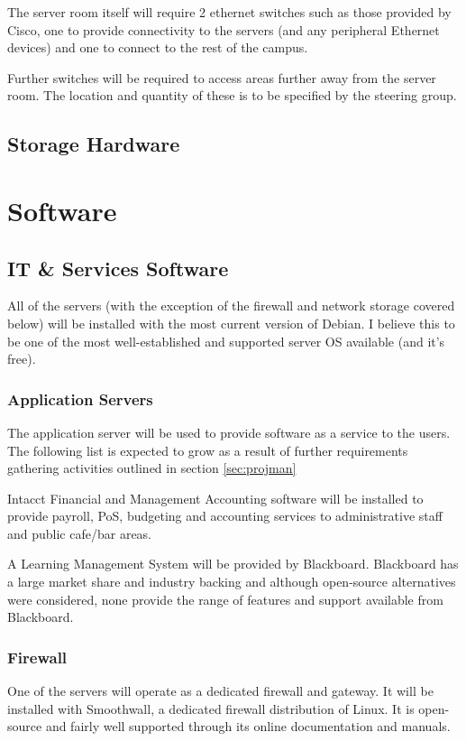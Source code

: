 \documentclass[a4paper, twoside]{article}
\begin{document}
The server room itself will require 2 ethernet switches such as those
provided by Cisco, one to provide connectivity to the servers (and any
peripheral Ethernet devices) and one to connect to the rest of the campus.

Further switches will be required to access areas further away from the server
room. The location and quantity of these is to be specified by the steering
group.

\subsection{Storage Hardware}


\section{Software}
\subsection{IT \& Services Software}
All of the servers (with the exception of the firewall and network storage covered below) will be installed with the most current version of Debian. I
believe this to be one of the most well-established and supported server OS
available (and it's free).

\subsubsection{Application Servers}
The application server will be used to provide software as a service to the
users. The following list is expected to grow as a result of further
requirements gathering activities outlined in section \ref{sec:projman}

Intacct Financial and Management Accounting software will be installed to
provide payroll, PoS, budgeting and accounting services to administrative staff
and public cafe/bar areas.

A Learning Management System will be provided by Blackboard. Blackboard has a
large market share and industry backing \cite{bb} and although open-source
alternatives were considered, none provide the range of features and support
available from Blackboard.

\subsubsection{Firewall}
One of the servers will operate as a dedicated firewall and gateway. It will be
installed with Smoothwall, a dedicated firewall distribution of Linux. It is
open-source and fairly well supported through its online documentation and
manuals.
\end{document}
